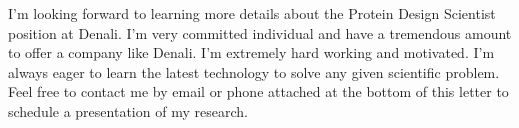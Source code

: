 \documentclass[11pt,a4paper,sans]{moderncv}        %
\begin{document}
\vspace{0.1in}
I'm looking forward to learning more details about the Protein Design Scientist position at Denali. I'm very committed individual and have a tremendous amount
 to offer a company like Denali. I'm extremely hard working and motivated. I'm always eager to learn the latest technology to solve any given scientific problem. 
Feel free to contact me by email or phone attached at the bottom of this letter  to schedule a presentation of my research. 

\makeletterclosing
\end{document}
